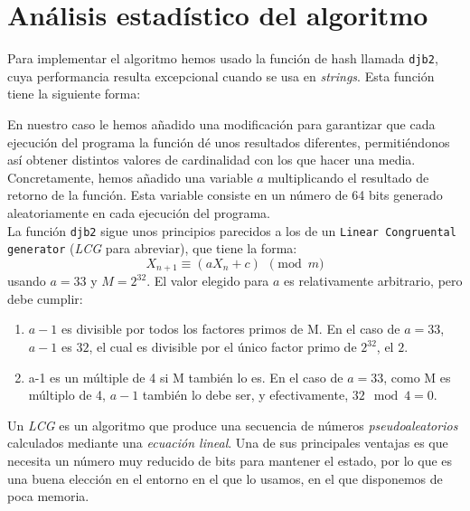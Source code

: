 % 
\section{Análisis estadístico del algoritmo}

Para implementar el algoritmo hemos usado la función de hash llamada \texttt{djb2}, cuya performancia resulta excepcional cuando se usa en \textit{strings}. Esta función tiene la siguiente forma:

\begin{algorithm}[h]
\caption{\texttt{Función de hash \textbf{djb2}}

\begin{algorithmic}
	\STATE $unsigned long$
	\STATE $hash(unsigned char *str)$
	\STATE ${$
		\STATE $unsigned long hash = 5381$
		\STATE $int c;$
		\WHILE{$c = *str++$}
			\STATE $hash = hash * 33 + c$
		\ENDWHILE
		\STATE $return hash$
	\STATE $}$
\end{algorithmic}
\end{algorithm}

En nuestro caso le hemos añadido una modificación para garantizar que cada ejecución del programa la función dé unos resultados diferentes, permitiéndonos así obtener distintos valores de cardinalidad con los que hacer una media. Concretamente, hemos añadido una variable $a$ multiplicando el resultado de retorno de la función. Esta variable consiste en un número de 64 bits generado aleatoriamente en cada ejecución del programa.
\\

La función \texttt{djb2} sigue unos principios parecidos a los de un \texttt{Linear Congruental generator}  (\textit{LCG} para abreviar), que tiene la forma:
$$X_{n+1} \equiv \left( a X_n + c \right)~~\pmod{m}$$
usando $a=33$ y $M=2^{32}$. El valor elegido para $a$ es relativamente arbitrario, pero debe cumplir:

\begin{enumerate}
	\item $a-1$ es divisible por todos los factores primos de M. En el caso de $a=33$, $a-1$ es $32$, el cual es divisible por el único factor primo de $2^{32}$, el $2$.
	\item a-1 es un múltiple de 4 si M también lo es. En el caso de $a=33$, como M es múltiplo de 4, $a-1$ también lo debe ser, y efectivamente, $32 \mod 4 = 0$.
\end{enumerate}

Un \textit{LCG} es un algoritmo que produce una secuencia de números \textit{pseudoaleatorios} calculados mediante una \textit{ecuación lineal}. Una de sus principales ventajas es que necesita un número muy reducido de bits para mantener el estado, por lo que es una buena elección en el entorno en el que lo usamos, en el que disponemos de poca memoria.

